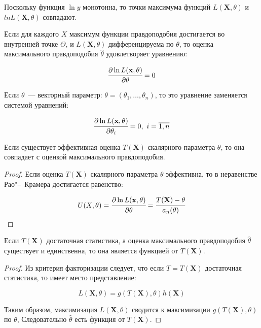 \begin{rmrk}
Поскольку функция $\operatorname{ln}y$ монотонна, то точки максимума функций $L(\mathbf{X},\theta)$ и $ln L(\mathbf{X},\theta)$ совпадают.
\end{rmrk}

Если для каждого $X$ максимум функции правдоподобия достигается во внутренней точке $\Theta$, и $L(\mathbf{X},\theta)$ дифференцируема по $\theta$, то оценка максимального правдоподобия $\hat{\theta}$ удовлетворяет уравнению:

\begin{equation*}
    \cfrac{\partial \ln L(\mathbf{x}, \theta)}{\partial \theta}=0
\end{equation*}

Если $\theta$~--- векторный параметр: $\theta=\left(\theta_{1}, \ldots, \theta_{n}\right)$, то это уравнение заменяется системой уравнений:

\begin{equation*}
    \cfrac{\partial \ln L(\mathbf{x}, \theta)}{\partial \theta_{i}}=0,~ i=\overline{1, n} 
\end{equation*}

\begin{thm*}
Если существует эффективная оценка $T(\mathbf{X})$ скалярного параметра $\theta$, то она совпадает с оценкой максимального правдоподобия.
\end{thm*}

\begin{proof}
Если оценка $T(\mathbf{X})$ скалярного параметра $\theta$ эффективна, то в неравенстве Рао"--~Крамера достигается равенство:

\begin{equation*}
    U(X,\theta) = \cfrac{\partial \ln L(\mathbf{x}, \theta)}{\partial \theta}=\cfrac{T(\mathbf{X})-\theta}{a_n(\theta)}
\end{equation*}

\end{proof}

\begin{thm*}
Если $T(\mathbf{X})$ достаточная статистика, а оценка максимального правдоподобия $\hat{\theta}$ существует и единственна, то она является функцией от $T(\mathbf{X})$.
\end{thm*}

\begin{proof}
Из критерия факторизации следует, что если $T=T(\mathbf{X})$ достаточная статистика, то имеет место представление:

\begin{equation*}
    L(\mathbf{X}, \theta)=g(T(\mathbf{X}), \theta) h(\mathbf{X})
\end{equation*}

Таким образом, максимизация $L(\mathbf{X},\theta)$ сводится к максимизации $g(T(\mathbf{X}), \theta)$ по $\theta$, Следовательно $\hat{\theta}$ есть функция от $T(\mathbf{X})$.
\end{proof}

